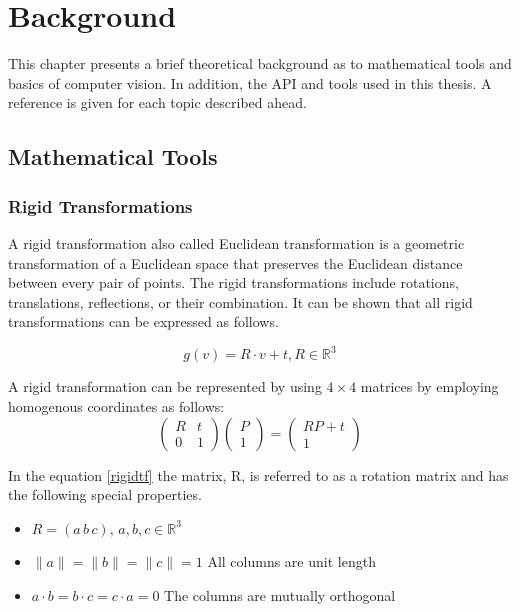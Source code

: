 
\chapter{Background}
\label{chap:back}

This chapter presents a brief theoretical background as to mathematical tools and basics of computer vision. In addition, the API and tools used in this thesis. A reference is given for each topic described ahead.


\section{ Mathematical Tools}
\subsection{Rigid Transformations}\label{rigidtf0}
A rigid transformation also called Euclidean transformation is a geometric transformation of a Euclidean space that preserves the Euclidean distance between every pair of points. The rigid transformations include rotations, translations, reflections, or their combination. It can be shown that all rigid transformations can be expressed as follows.

\begin{equation}\label{rigidtf}
 g(v)=R \cdot v + t, R \in \mathbb{R}^{3}
\end{equation}

A rigid transformation can be represented by using $4\times4$ matrices by employing homogenous coordinates as follows:
$$
\begin{pmatrix}
R & t \\
0 & 1
\end{pmatrix}
\begin{pmatrix}
P \\
1
\end{pmatrix}=
\begin{pmatrix}
RP+t \\
1
\end{pmatrix}
$$

 In the equation \ref{rigidtf} the matrix, R, is referred to as a rotation matrix and has the following special properties.
\begin{itemize}
\item $R=(a\,  b\,  c), \, a,b,c \in \mathbb{R}^{3}$
\item $\|a\|=\|b\|=\|c\|=1 $ All columns are unit length
\item $a \cdot b=b \cdot c=c \cdot a=0 $ The columns are mutually orthogonal
\end{itemize}
